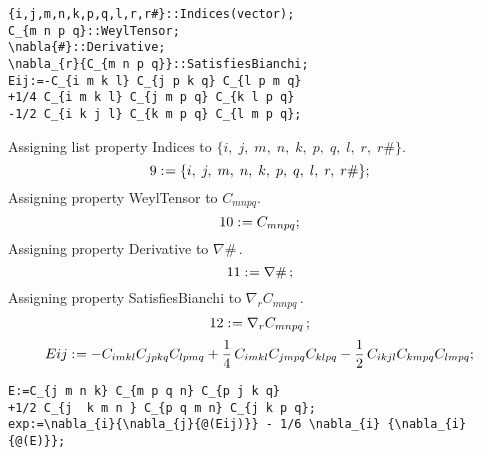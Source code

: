 \documentclass[11pt]{article}
\def\specialcolon{\mathrel{\mathop{:}}\hspace{-.5em}}
\begin{document}
{\color[named]{Blue}\begin{verbatim}
{i,j,m,n,k,p,q,l,r,r#}::Indices(vector);
C_{m n p q}::WeylTensor;
\nabla{#}::Derivative;
\nabla_{r}{C_{m n p q}}::SatisfiesBianchi;
Eij:=-C_{i m k l} C_{j p k q} C_{l p m q}
+1/4 C_{i m k l} C_{j m p q} C_{k l p q}
-1/2 C_{i k j l} C_{k m p q} C_{l m p q};
\end{verbatim}}
Assigning list property Indices to $\{i,\; j,\; m,\; n,\; k,\; p,\; q,\; l,\; r,\; r\#\}$.
\\
\begin{dmath*}[compact, spread=2pt]
9\specialcolon{}= \{i,\; j,\; m,\; n,\; k,\; p,\; q,\; l,\; r,\; r\#\};
\end{dmath*}
Assigning property WeylTensor to ${C}_{m n p q}$.
\\
\begin{dmath*}[compact, spread=2pt]
10\specialcolon{}= {C}_{m n p q};
\end{dmath*}
Assigning property Derivative to $\nabla{\#}\, $.
\\
\begin{dmath*}[compact, spread=2pt]
11\specialcolon{}= \nabla{\#}\, ;
\end{dmath*}
Assigning property SatisfiesBianchi to ${\nabla}_{r}{{C}_{m n p q}}\, $.
\\
\begin{dmath*}[compact, spread=2pt]
12\specialcolon{}= {\nabla}_{r}{{C}_{m n p q}}\, ;
\end{dmath*}
\begin{dmath*}[compact, spread=2pt]
Eij\specialcolon{}=  - {C}_{i m k l} {C}_{j p k q} {C}_{l p m q} + \frac{1}{4}\, {C}_{i m k l} {C}_{j m p q} {C}_{k l p q} - \frac{1}{2}\, {C}_{i k j l} {C}_{k m p q} {C}_{l m p q};
\end{dmath*}
{\color[named]{Blue}\begin{verbatim}
E:=C_{j m n k} C_{m p q n} C_{p j k q}
+1/2 C_{j  k m n } C_{p q m n} C_{j k p q};
exp:=\nabla_{i}{\nabla_{j}{@(Eij)}} - 1/6 \nabla_{i} {\nabla_{i} {@(E)}};
\end{verbatim}}
\end{document}
